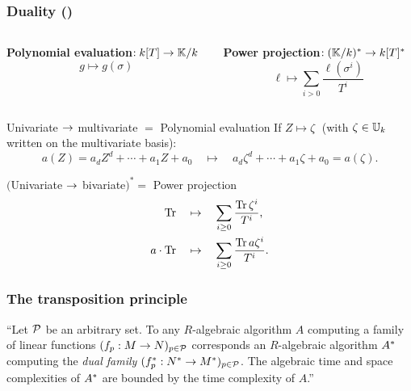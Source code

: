 \documentclass[10pt,usepdftitle=false]{beamer}
\begin{document}
\begin{frame}
  \frametitle{Duality (\cite{shoup95,shoup99,bostan+salvy+schost03})}

  \vspace{-6mm}

  \begin{columns}[b]
    \begin{column}{0.5\textwidth}
      \begin{center}
        \textbf{Polynomial evaluation}$:k[T]\rightarrow\mathbb{K}/k$
        \[g\mapsto g(\sigma)\]
      \end{center}
    \end{column}
    \begin{column}{0.5\textwidth}
      \begin{center}
        \textbf{Power projection}$:(\mathbb{K}/k)^\ast\rightarrow k[T]^\ast$
        \[\ell \mapsto \sum_{i>0} \frac{\ell(\sigma^i)}{T^i}\]
      \end{center}
    \end{column}
  \end{columns}

  \begin{block}{Univariate $\rightarrow$ multivariate $=$ Polynomial evaluation}
    If $Z \mapsto \zeta\;$ (with $\zeta\in\mathbb{U}_k$ written on the
    multivariate basis):
    \[a(Z) = a_dZ^d + \cdots + a_1Z + a_0 \quad\mapsto\quad a_d\zeta^d + \cdots + a_1\zeta + a_0 =a(\zeta)\text{.}\]
  \end{block}

  \begin{block}{$($Univariate $\rightarrow$ bivariate$)^\ast=$ Power projection}
    \begin{align*}
      \operatorname{Tr} &\quad\mapsto\quad \sum_{i\ge0}\frac{\operatorname{Tr}\zeta^i}{T^i}\text{,}\\
      a\cdot\operatorname{Tr} &\quad\mapsto\quad \sum_{i\ge0}\frac{\operatorname{Tr} a\zeta^i}{T^i}\text{.}
    \end{align*}
  \end{block}
\end{frame}


\begin{frame}
  \frametitle{The transposition principle}

  \large
  
  \begin{theorem}
    ``Let $\mathcal{P}$ be an arbitrary set. To any $R$-algebraic
    algorithm $A$ computing a family of linear functions $(f_p:M\rightarrow
    N)_{p\in\mathcal{P}}$ corresponds an $R$-algebraic algorithm
    $A^\ast$ computing the \emph{dual family}
    $(f^\ast_p:N^\ast\rightarrow M^\ast)_{p\in\mathcal{P}}$. The algebraic
    time and space complexities of $A^\ast$ are bounded by the time
    complexity of $A$.''
  \end{theorem}
  
\end{frame}
\end{document}

